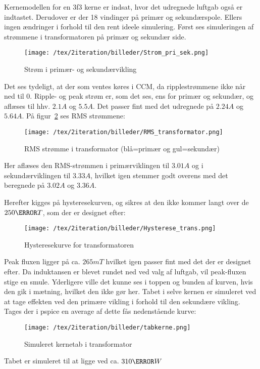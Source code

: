Kernemodellen for en 3f3 kerne er indsat, hvor det udregnede luftgab også er indtastet. Derudover er der 18 vindinger på primær og sekundærspole. Ellers ingen ændringer i forhold til den rent ideele simulering. Først ses simuleringen af strømmene i transformatoren på primær og sekundær side.
\begin{figure}[H]
	\center
	\texttt{[image: /tex/2iteration/billeder/Strom\_pri\_sek.png]}
	\caption{Strøm i primær- og sekundærvikling}
	\label{fig: prisek_strom}
\end{figure}
Det ses tydeligt, at der som ventes køres i CCM, da ripplestrømmene ikke når ned til 0. Ripple- og peak strøm er, som det ses, ens for primær og sekundær, og aflæses til hhv. $2.1A$ og $5.5A$. Det passer fint med det udregnede på $2.24A$ og $5.64A$.
På figur~\ref{fig: RMS_trans} ses RMS strømmene:
\begin{figure}[H]
	\center
	\texttt{[image: /tex/2iteration/billeder/RMS\_transformator.png]}
	\caption{RMS strømme i transformator (blå=primær og gul=sekundær)}
	\label{fig: RMS_trans}
\end{figure}

Her aflæses den RMS-strømmen i primærviklingen til $3.01A$ og i sekundærviklingen til $3.33A$, hvilket igen stemmer godt overens med det beregnede på $3.02A$ og $3.36A$.


\noindent Herefter kigges på hysteresekurven, og sikres at den ikke kommer langt over de $250\milli T$, som der er designet efter:
\begin{figure}[H]
	\center
	\texttt{[image: /tex/2iteration/billeder/Hysterese\_trans.png]}
	\caption{Hysteresekurve for transformatoren}
	\label{fig: Hysterese_trans}
\end{figure}
Peak fluxen ligger på ca. $265mT$ hvilket igen passer fint med det der er designet efter. Da induktansen er blevet rundet ned ved valg af luftgab, vil peak-fluxen stige en smule. Yderligere ville det kunne ses i toppen og bunden af kurven, hvis den gik i mætning, hvilket den ikke gør her.
Tabet i selve kernen er simuleret ved at tage effekten ved den primære vikling i forhold til den sekundære vikling. Tages der i pspice en average af dette fås nedenstående kurve:
\begin{figure}[H]
	\center
	\texttt{[image: /tex/2iteration/billeder/tabkerne.png]}
	\caption{Simuleret kernetab i transformator}
	\label{fig: Kernetab}
\end{figure}
\noindent Tabet er simuleret til at ligge ved ca. $310\milli W$

